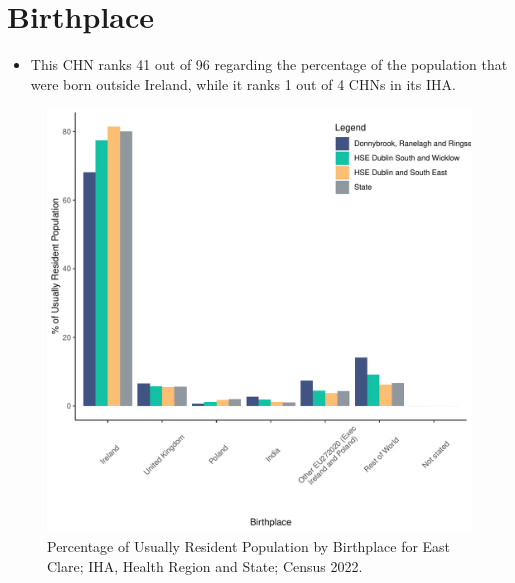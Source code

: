 \documentclass{article}
\begin{document}
\section{Birthplace}\label{sect:Birth}
\begin{itemize}
\item This CHN ranks  41 out of 96 regarding the percentage of the population that were born outside Ireland, while it ranks  1 out of 4 CHNs in its IHA.
\end{itemize}
\begin{figure}[H]
	\centering
	\includegraphics[width = 130mm]{../figures/BirthED.pdf}
	\caption{Percentage of Usually Resident Population by Birthplace for East Clare; IHA, Health Region and State; Census 2022.}
	\label{fig:vbnv}
	\end{figure}
	
\end{document}
